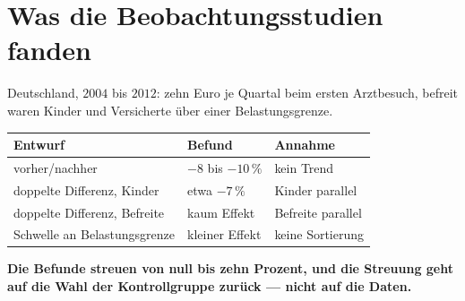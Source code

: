 \section{Was die Beobachtungsstudien fanden}

\begin{merksatz}
Deutschland, $2004$ bis $2012$: zehn Euro je Quartal beim ersten Arztbesuch, befreit waren Kinder und Versicherte über einer Belastungsgrenze.

\begin{center}
{\small
\renewcommand{\arraystretch}{1.5}
\begin{tabular}{@{}P{3.0cm}P{2.4cm}P{3.0cm}@{}}
\toprule
\textbf{Entwurf} & \textbf{Befund} & \textbf{Annahme}\\
\midrule
vorher/nachher & $-8$ bis $-10\,\%$ & kein Trend\\
doppelte Differenz, Kinder & etwa $-7\,\%$ & Kinder parallel\\
doppelte Differenz, Befreite & kaum Effekt & Befreite parallel\\
Schwelle an Belastungsgrenze & kleiner Effekt & keine Sortierung\\
\bottomrule
\end{tabular}}
\end{center}

\begin{center}
\begin{minipage}{0.9\textwidth}
\textbf{Die Befunde streuen von null bis zehn Prozent, und die Streuung geht auf die Wahl der Kontrollgruppe zurück --- nicht auf die Daten.}
\end{minipage}
\end{center}

\begin{center}
\begin{minipage}{0.88\textwidth}
\end{minipage}
\end{center}
\end{merksatz}

